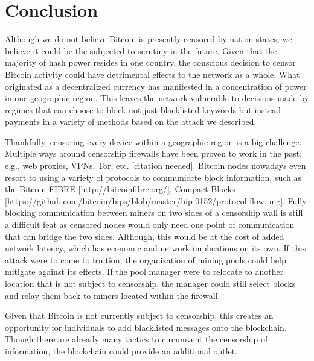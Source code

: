 \section{Conclusion}
Although we do not believe Bitcoin is presently censored by nation states, we believe it could be the subjected to scrutiny in the future. Given that the majority of hash power resides in one country, the conscious decision to censor Bitcoin activity could have detrimental effects to the network as a whole. What originated as a decentralized currency has manifested in a concentration of power in one geographic region. This leaves the network vulnerable to decisions made by regimes that can choose to block not just blacklisted keywords but instead payments in a variety of methods based on the attack we described.

Thankfully, censoring every device within a geographic region is a big challenge. Multiple ways around censorship firewalls have been proven to work in the past; e.g., web proxies, VPNs, Tor, etc. [citation needed]. Bitcoin nodes nowadays even resort to using a variety of protocols to communicate block information, such as the Bitcoin FIBRE [http://bitcoinfibre.org/], Compact Blocks [https://github.com/bitcoin/bips/blob/master/bip-0152/protocol-flow.png]. Fully blocking communication between miners on two sides of a censorship wall is still a difficult feat as censored nodes would only need one point of communication that can bridge the two sides. Although, this would be at the cost of added network latency, which has economic and network implications on its own. If this attack were to come to fruition, the organization of mining pools could help mitigate against its effects. If the pool manager were to relocate to another location that is not subject to censorship, the manager could still select blocks and relay them back to miners located within the firewall.

Given that Bitcoin is not currently subject to censorship, this creates an opportunity for individuals to add blacklisted messages onto the blockchain. Though there are already many tactics to circumvent the censorship of information, the blockchain could provide an additional outlet.

